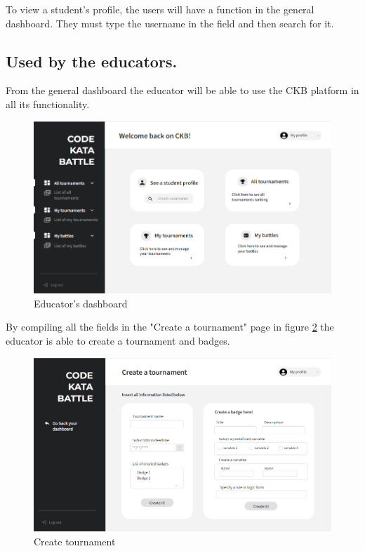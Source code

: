 To view a student's profile, the users will have a function in the general dashboard. They must type the username in the field and then search for it.
\clearpage

\subsection*{Used by the educators.}
From the general dashboard the educator will be able to use the CKB platform in all its functionality. 
\begin{figure}[h]
    \centering
    \includegraphics[width=\textwidth]{images/mockups/educators/Edashboard.png}
    \caption{Educator's dashboard}
    \label{fig:dashE}
\end{figure}

By compiling all the fields in the "Create a tournament" page in figure \ref{fig:createT} the educator is able to create a tournament and badges.
\begin{figure}[h]
    \centering
    \includegraphics[width=\textwidth]{images/mockups/educators/createT.png}
    \caption{Create tournament}
    \label{fig:createT}
\end{figure}
\clearpage

